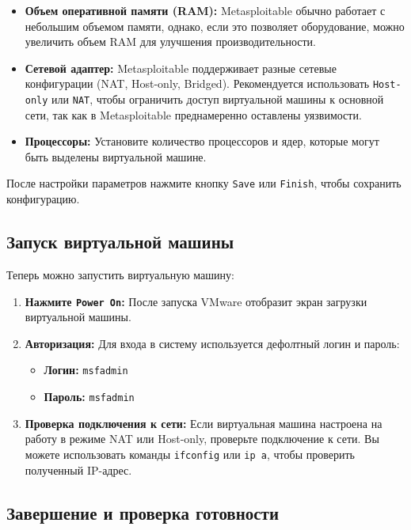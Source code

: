 \begin{itemize}
	\item \textbf{Объем оперативной памяти (RAM):} Metasploitable обычно работает с небольшим объемом памяти, однако, если это позволяет оборудование, можно увеличить объем RAM для улучшения производительности.
	\item \textbf{Сетевой адаптер:} Metasploitable поддерживает разные сетевые конфигурации (NAT, Host-only, Bridged). Рекомендуется использовать \texttt{Host-only} или \texttt{NAT}, чтобы ограничить доступ виртуальной машины к основной сети, так как в Metasploitable преднамеренно оставлены уязвимости.
	\item \textbf{Процессоры:} Установите количество процессоров и ядер, которые могут быть выделены виртуальной машине.
\end{itemize}

После настройки параметров нажмите кнопку \texttt{Save} или \texttt{Finish}, чтобы сохранить конфигурацию.

\subsection{Запуск виртуальной машины}

Теперь можно запустить виртуальную машину:

\begin{enumerate}
	\item \textbf{Нажмите \texttt{Power On}:} После запуска VMware отобразит экран загрузки виртуальной машины.
	\item \textbf{Авторизация:} Для входа в систему используется дефолтный логин и пароль:
	\begin{itemize}
		\item \textbf{Логин:} \texttt{msfadmin}
		\item \textbf{Пароль:} \texttt{msfadmin}
	\end{itemize}
	\item \textbf{Проверка подключения к сети:} Если виртуальная машина настроена на работу в режиме NAT или Host-only, проверьте подключение к сети. Вы можете использовать команды \texttt{ifconfig} или \texttt{ip a}, чтобы проверить полученный IP-адрес.
\end{enumerate}

\subsection{Завершение и проверка готовности}

